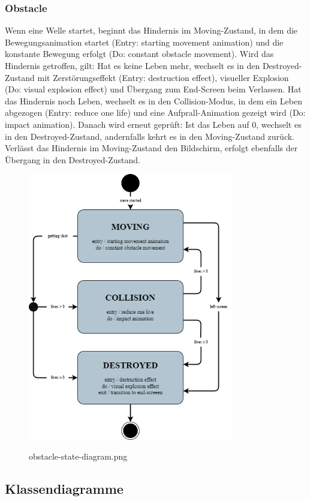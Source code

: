 \documentclass[10pt]{article}
\begin{document}
\newpage
\subsubsection{Obstacle}
Wenn eine Welle startet, beginnt das Hindernis im Moving-Zustand, in dem die Bewegungsanimation startet (Entry: starting movement animation) und die konstante Bewegung erfolgt (Do: constant obstacle movement).
Wird das Hindernis getroffen, gilt: Hat es keine Leben mehr, wechselt es in den Destroyed-Zustand mit Zerstörungseffekt (Entry: destruction effect), visueller Explosion (Do: visual explosion effect) und Übergang zum End-Screen beim Verlassen. Hat das Hindernis noch Leben, wechselt es in den Collision-Modus, in dem ein Leben abgezogen (Entry: reduce one life) und eine Aufprall-Animation gezeigt wird (Do: impact animation). Danach wird erneut geprüft: Ist das Leben auf 0, wechselt es in den Destroyed-Zustand, andernfalls kehrt es in den Moving-Zustand zurück.
Verlässt das Hindernis im Moving-Zustand den Bildschirm, erfolgt ebenfalls der Übergang in den Destroyed-Zustand.
\begin{figure}
	\centering
	\includegraphics[width=0.8\textwidth]{../../../images/Pflichtenheft_Assets/uml-state-diagram/obstacle-state-diagram.png}\\
	\caption{obstacle-state-diagram.png}
\end{figure}

\newpage
	\subsection{Klassendiagramme}
\end{document}
